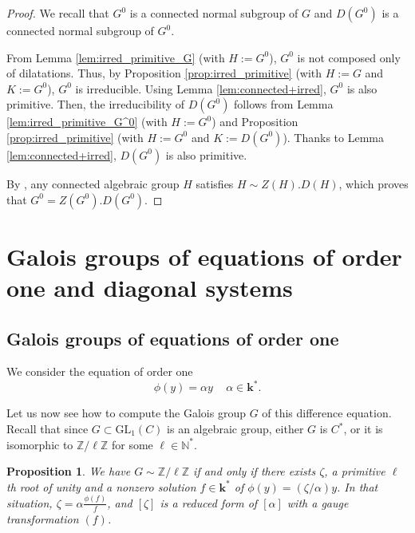 \documentclass[a4paper,11pt]{amsart}
\newtheorem{prop}[thm]{Proposition}
\def\k{\mathbf{k}}
\def\Z{\mathbb{Z}}
\def\N{\mathbb{N}}
\begin{document}
\begin{proof}
We recall that $G^0$ is a connected normal subgroup of $G$ and $D(G^0)$ is a connected normal subgroup of $G^0$.

From Lemma \ref{lem:irred_primitive_G} (with $H:=G^0$), $G^0$ is not composed only of dilatations. Thus, by Proposition \ref{prop:irred_primitive} (with $H:=G$ and $K:=G^0$), $G^0$ is irreducible. Using Lemma \ref{lem:connected+irred}, $G^0$ is also primitive. 
Then, the irreducibility of $D(G^0)$ follows from Lemma \ref{lem:irred_primitive_G^0} (with $H:=G^0$) and Proposition \ref{prop:irred_primitive} (with $H:=G^0$ and $K:=D(G^0)$). Thanks to Lemma \ref{lem:connected+irred}, $D(G^0)$ is also primitive.

By \cite[Corollary 8.1.6]{springer1998linear}, any connected algebraic group $H$ satisfies $H\sim Z(H). D(H)$, which proves that $G^0=Z(G^0).D(G^0)$. 
\end{proof}

\section{Galois groups of equations of order one and diagonal systems}\label{sec:GaloisGpsOrderOneEtDiag}

\subsection{Galois groups of equations of order one}\label{secorder1}

We consider the equation of order one
\begin{equation}
\label{eq:orderone}
\phi(y)=\alpha y \, \quad \alpha\in \k^*.
\end{equation}

Let us now see how to compute the Galois group $G$ of this difference equation. Recall that since $G\subset \mathrm{GL}_1 (C)$ is an algebraic group, either $G$ is $C^*$, or it is isomorphic to $\Z/\ell\Z$ for some $\ell \in \N^*$.

\begin{prop}\label{propord1}
 We have $G\sim \Z/\ell\Z$ if and only if there exists $\zeta$, a primitive $\ell$th root of unity and  a nonzero solution $f\in \k^*$ of  $\phi(y)=(\zeta/\alpha)y$.  In that situation,  $\zeta=\alpha\frac{\phi(f)}{f}$, and $[\zeta]$ is a reduced form of $[\alpha]$ with a gauge transformation $(f)$.  
\end{prop}
\end{document}
